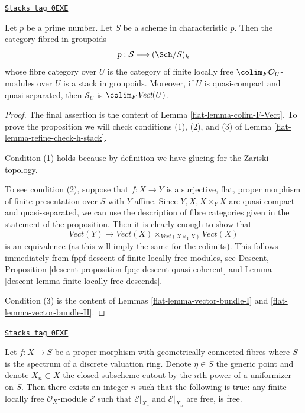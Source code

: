 \begin{proposition}
\label{flat-proposition-h-descent-vector-bundles-p}
\href{https://stacks.math.columbia.edu/tag/0EXE}{\texttt{Stacks tag 0EXE}}

Let $p$ be a prime number. Let $S$ be a scheme in characteristic $p$.
Then the category fibred in groupoids
$$
p : \mathcal{S} \longrightarrow (\Sch/S)_h
$$
whose fibre category over $U$ is the category
of finite locally free $\colim_F \mathcal{O}_U$-modules over $U$
is a stack in groupoids. Moreover, if $U$ is quasi-compact
and quasi-separated, then $\mathcal{S}_U$ is $\colim_F \textit{Vect}(U)$.
\end{proposition}

\begin{proof}

The final assertion is the content of Lemma \ref{flat-lemma-colim-F-Vect}.
To prove the proposition we will check conditions (1), (2), and (3) of
Lemma \ref{flat-lemma-refine-check-h-stack}.

\medskip\noindent
Condition (1) holds because by definition we have glueing
for the Zariski topology.

\medskip\noindent
To see condition (2), suppose that $f : X \to Y$ is a surjective,
flat, proper morphism of finite presentation over $S$ with $Y$ affine.
Since $Y, X, X \times_Y X$ are quasi-compact and quasi-separated,
we can use the description of fibre categories given in the
statement of the proposition. Then it is clearly enough to
show that
$$
\textit{Vect}(Y)
\longrightarrow
\textit{Vect}(X)
\times_{\textit{Vect}(X \times_Y X)}
\textit{Vect}(X)
$$
is an equivalence (as this will imply the same for the colimits).
This follows immediately from fppf descent of finite locally free modules, see
Descent, Proposition \ref{descent-proposition-fpqc-descent-quasi-coherent} and
Lemma \ref{descent-lemma-finite-locally-free-descends}.

\medskip\noindent
Condition (3) is the content of
Lemmas \ref{flat-lemma-vector-bundle-I} and \ref{flat-lemma-vector-bundle-II}.
\end{proof}

\begin{lemma}
\label{flat-lemma-trivial-fibres-dvr}
\href{https://stacks.math.columbia.edu/tag/0EXF}{\texttt{Stacks tag 0EXF}}

Let $f : X \to S$ be a proper morphism with geometrically connected fibres
where $S$ is the spectrum of a discrete valuation ring. Denote $\eta \in S$
the generic point and denote $X_n \subset X$ the closed subscheme
cutout by the $n$th power of a uniformizer on $S$.
Then there exists
an integer $n$ such that the following is true: any finite
locally free $\mathcal{O}_X$-module $\mathcal{E}$
such that $\mathcal{E}|_{X_\eta}$ and $\mathcal{E}|_{X_n}$
are free, is free.
\end{lemma}

